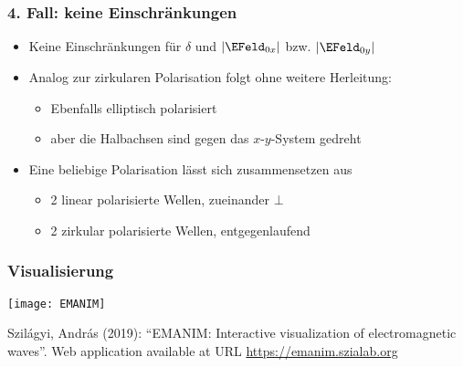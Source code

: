 \begin{frame}
  \frametitle{4. Fall: keine Einschränkungen}
  \begin{itemize}[<+->]
  \item Keine Einschränkungen für \(\delta\) und \(\vert \EFeld_{0x} \vert\) bzw. \(\vert \EFeld_{0y} \vert  \)
  \item Analog zur zirkularen Polarisation folgt ohne weitere Herleitung:
    \begin{itemize}[<+->]
    \item Ebenfalls \alert{elliptisch polarisiert}
      \item aber die Halbachsen sind gegen das \(x\)-\(y\)-System gedreht
      \end{itemize}

\item Eine beliebige Polarisation lässt sich zusammensetzen aus
\begin{itemize}
\item 2 linear polarisierte Wellen, zueinander $\bot$
\item 2 zirkular polarisierte Wellen, entgegenlaufend
\end{itemize}
\end{itemize}
\end{frame}

\begin{frame}
  \frametitle{Visualisierung}
  \texttt{[image: EMANIM]}
  
  Szilágyi, András (2019): \enquote{EMANIM: Interactive visualization of electromagnetic waves}. Web application available at URL \url{https://emanim.szialab.org}
\end{frame}




   
